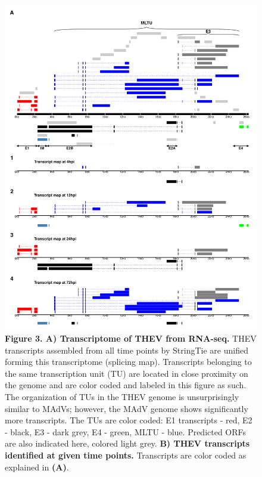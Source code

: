 \documentclass[
]{article}
\begin{document}
\begin{figure}
\centering
\includegraphics{results/r/figures/figure3.png}
\caption{\textbf{Figure 3. A) Transcriptome of THEV from RNA-seq.} THEV
transcripts assembled from all time points by StringTie are unified
forming this transcriptome (splicing map). Transcripts belonging to the
same transcription unit (TU) are located in close proximity on the
genome and are color coded and labeled in this figure as such. The
organization of TUs in the THEV genome is unsurprisingly similar to
MAdVs; however, the MAdV genome shows significantly more transcripts.
The TUs are color coded: E1 transcripts - red, E2 - black, E3 - dark
grey, E4 - green, MLTU - blue. Predicted ORFs are also indicated here,
colored light grey. \textbf{B) THEV transcripts identified at given time
points.} Transcripts are color coded as explained in \textbf{(A)}.}
\end{figure}
\end{document}
